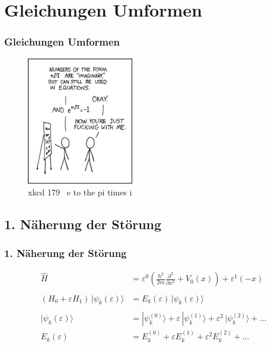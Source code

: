 \documentclass[aspectratio=169]{beamer}
\begin{document}
\section{ Gleichungen Umformen }
\begin{frame}
  \frametitle{ Gleichungen Umformen }
  \begin{figure}
    \centering
    \includegraphics[height=5.6cm]{./179_e_to_the_pi_times_i.png}
    \caption{ xkcd 179 \textendash \ e to the pi times i }
  \end{figure}
\end{frame}

\subsection{ 1. N\"aherung der St\"orung }
\begin{frame}
  \frametitle{ 1. N\"aherung der St\"orung }
  \begin{align*}
    \hat{H} &= \varepsilon^0 ( \frac{\hbar^2}{2m} \frac{\partial^2}{\partial x^2} + V_0(x) )
               + \varepsilon^1 (  - x )
  \\
  \\
    (H_0+\varepsilon H_1)\,|\psi_k(\varepsilon)\rangle
    &=
    E_k(\varepsilon)\,|\psi_k(\varepsilon)\rangle
  \\
  \\
    |\psi_k(\varepsilon)\rangle
    &=
    |\psi_k^{(0)}\rangle+\varepsilon\,|\psi_k^{(1)}\rangle
    +\varepsilon^2\,|\psi_k^{(2)}\rangle+\dots
  \\
    E_k(\varepsilon)
    &=
    E_k^{(0)}+\varepsilon E_k^{(1)} + \varepsilon^2 E_k^{(2)}+\dots
  \end{align*}
  
\end{frame}
\end{document}
